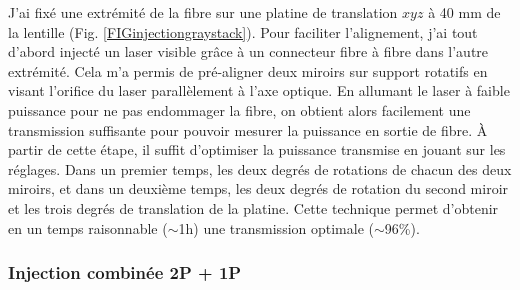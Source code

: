 
J'ai fixé une extrémité de la fibre sur une platine de translation $xyz$ à 40 mm de la lentille (Fig. \ref{FIGinjectiongraystack}). Pour faciliter l'alignement, j'ai tout d'abord injecté un laser visible grâce à un connecteur fibre à fibre dans l'autre extrémité. Cela m'a permis de pré-aligner deux miroirs sur support rotatifs en visant l'orifice du laser parallèlement à l'axe optique. En allumant le laser à faible puissance pour ne pas endommager la fibre, on obtient alors facilement une transmission suffisante pour pouvoir mesurer la puissance en sortie de fibre. À partir de cette étape, il suffit d'optimiser la puissance transmise en jouant sur les réglages. Dans un premier temps, les deux degrés de rotations de chacun des deux miroirs, et dans un deuxième temps, les deux degrés de rotation du second miroir et les trois degrés de translation de la platine. Cette technique permet d'obtenir en un temps raisonnable ($\sim$1h) une transmission optimale ($\sim$96\%).

\subsubsection{Injection combinée 2P + 1P}

